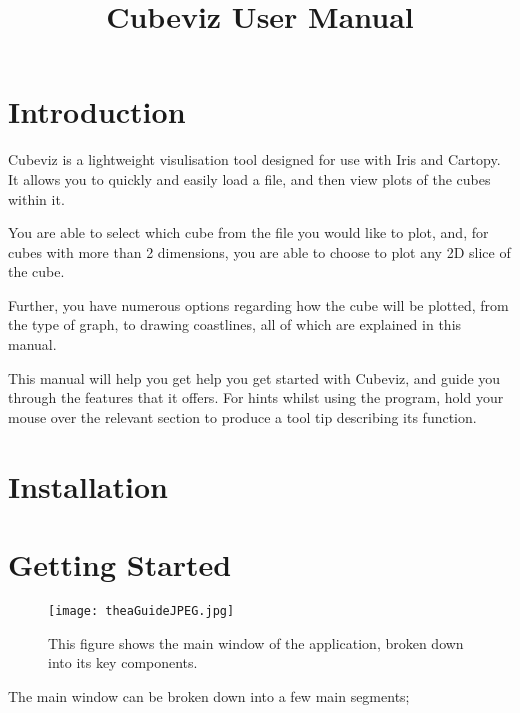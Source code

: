 \documentclass[a4paper,12pt]{article}
\begin{document}
\title{Cubeviz User Manual}
\maketitle

\tableofcontents

\section{Introduction}

Cubeviz is a lightweight visulisation tool designed for use with Iris and Cartopy.
It allows you to quickly and easily load a file, and then view plots of the cubes
within it.

You are able to select which cube from the file you would like to plot, and,
for cubes with more than 2 dimensions, you are able to choose to plot any
2D slice of the cube.

Further, you have numerous options regarding how the cube will be plotted,
from the type of graph, to drawing coastlines, all of which are explained in
this manual.

\vspace{4mm}

This manual will help you get help you get started with Cubeviz, and guide you
through the features that it offers. For hints whilst using the
program, hold your mouse over the relevant section to produce a tool
tip describing its function.

\pagebreak

\section{Installation}

\pagebreak

\section{Getting Started}

\begin{figure}[h]
\centering
\texttt{[image: theaGuideJPEG.jpg]}
\caption{This figure shows the main window of the application, broken down into
its key components.}
\label{overflow}
\end{figure}

The main window can be broken down into a few main segments;
\end{document}
